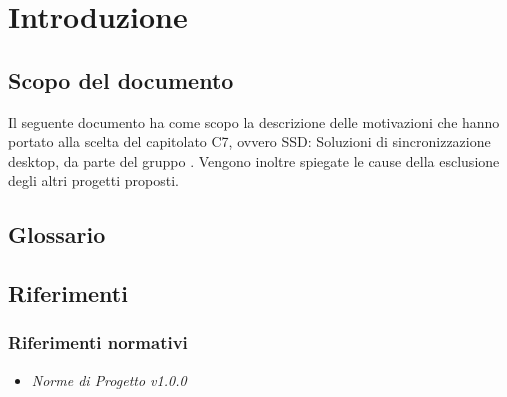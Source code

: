 \section{Introduzione}

\subsection{Scopo del documento}
Il seguente documento ha come scopo la descrizione delle motivazioni che hanno
portato alla scelta del capitolato C7, ovvero SSD: Soluzioni di sincronizzazione desktop, da parte del gruppo \gruppo{}. Vengono inoltre spiegate le cause della esclusione degli altri progetti proposti.
\subsection{Glossario}

\subsection{Riferimenti}
\subsubsection{Riferimenti normativi}
\begin{itemize}
\item \textit{Norme di Progetto v1.0.0}
\end{itemize}
